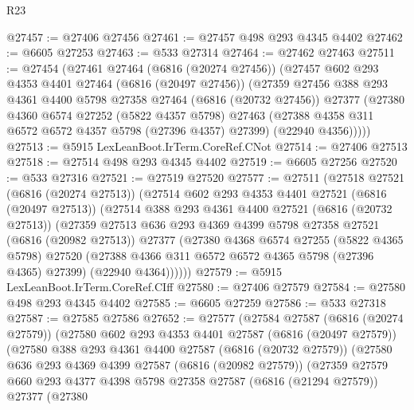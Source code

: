 \begin{lexlean}{R23}
\begin{coremodule}
@27457 := @27406 @27456
@27461 := @27457 @498 @293 @4345 @4402
@27462 := @6605 @27253
@27463 := @533 @27314
@27464 := @27462 @27463
@27511 := @27454
    (@27461
      @27464
      (@6816 (@20274 @27456))
      (@27457
        @602
        @293
        @4353
        @4401
        @27464
        (@6816 (@20497 @27456))
        (@27359
          @27456
          @388
          @293
          @4361
          @4400
          @5798
          @27358
          @27464
          (@6816 (@20732 @27456))
          @27377
          (@27380
            @4360
            @6574
            @27252
            (@5822 @4357 @5798)
            @27463
            (@27388 @4358 @311 @6572 @6572 @4357 @5798 (@27396 @4357) @27399)
            (@22940 @4356)))))
@27513 := @5915 LexLeanBoot.IrTerm.CoreRef.CNot
@27514 := @27406 @27513
@27518 := @27514 @498 @293 @4345 @4402
@27519 := @6605 @27256
@27520 := @533 @27316
@27521 := @27519 @27520
@27577 := @27511
    (@27518
      @27521
      (@6816 (@20274 @27513))
      (@27514
        @602
        @293
        @4353
        @4401
        @27521
        (@6816 (@20497 @27513))
        (@27514
          @388
          @293
          @4361
          @4400
          @27521
          (@6816 (@20732 @27513))
          (@27359
            @27513
            @636
            @293
            @4369
            @4399
            @5798
            @27358
            @27521
            (@6816 (@20982 @27513))
            @27377
            (@27380
              @4368
              @6574
              @27255
              (@5822 @4365 @5798)
              @27520
              (@27388 @4366 @311 @6572 @6572 @4365 @5798 (@27396 @4365) @27399)
              (@22940 @4364))))))
@27579 := @5915 LexLeanBoot.IrTerm.CoreRef.CIff
@27580 := @27406 @27579
@27584 := @27580 @498 @293 @4345 @4402
@27585 := @6605 @27259
@27586 := @533 @27318
@27587 := @27585 @27586
@27652 := @27577
    (@27584
      @27587
      (@6816 (@20274 @27579))
      (@27580
        @602
        @293
        @4353
        @4401
        @27587
        (@6816 (@20497 @27579))
        (@27580
          @388
          @293
          @4361
          @4400
          @27587
          (@6816 (@20732 @27579))
          (@27580
            @636
            @293
            @4369
            @4399
            @27587
            (@6816 (@20982 @27579))
            (@27359
              @27579
              @660
              @293
              @4377
              @4398
              @5798
              @27358
              @27587
              (@6816 (@21294 @27579))
              @27377
              (@27380

\end{coremodule}
\end{lexlean}

